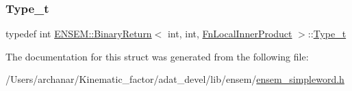 \mbox{\label{structENSEM_1_1BinaryReturn_3_01int_00_01int_00_01FnLocalInnerProduct_01_4_abc5bd3e21df0f42ad6b223a7b59549ba}} 
\subsubsection{\texorpdfstring{Type\_t}{Type\_t}\hspace{0.1cm}{\footnotesize\ttfamily [2/2]}}
{\footnotesize\ttfamily typedef int \mbox{\hyperlink{structENSEM_1_1BinaryReturn}{E\+N\+S\+E\+M\+::\+Binary\+Return}}$<$ int, int, \mbox{\hyperlink{structENSEM_1_1FnLocalInnerProduct}{Fn\+Local\+Inner\+Product}} $>$\+::\mbox{\hyperlink{structENSEM_1_1BinaryReturn_3_01int_00_01int_00_01FnLocalInnerProduct_01_4_abc5bd3e21df0f42ad6b223a7b59549ba}{Type\+\_\+t}}}



The documentation for this struct was generated from the following file\+:\begin{DoxyCompactItemize}
\item 
/\+Users/archanar/\+Kinematic\+\_\+factor/adat\+\_\+devel/lib/ensem/\mbox{\hyperlink{lib_2ensem_2ensem__simpleword_8h}{ensem\+\_\+simpleword.\+h}}\end{DoxyCompactItemize}
